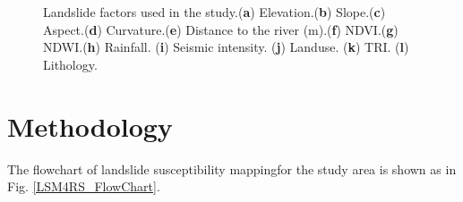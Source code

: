 \documentclass[a4paper,fleqn]{cas-sc}
\begin{document}
\begin{figure}
{    }
    \quad
    \quad
    \caption{Landslide factors used in the study.(\textbf{a}) Elevation.(\textbf{b}) Slope.(\textbf{c}) Aspect.(\textbf{d}) Curvature.(\textbf{e}) Distance to the river (m).(\textbf{f}) NDVI.(\textbf{g}) NDWI.(\textbf{h}) Rainfall. (\textbf{i}) Seismic intensity. (\textbf{j}) Landuse. (\textbf{k}) TRI. (\textbf{l}) Lithology.}
    \label{Fig_Landslide_Factors}
\end{figure}

\section{Methodology}

The flowchart of landslide susceptibility mappingfor the study area is shown as in Fig. \ref{LSM4RS_FlowChart}. 
\end{document}
